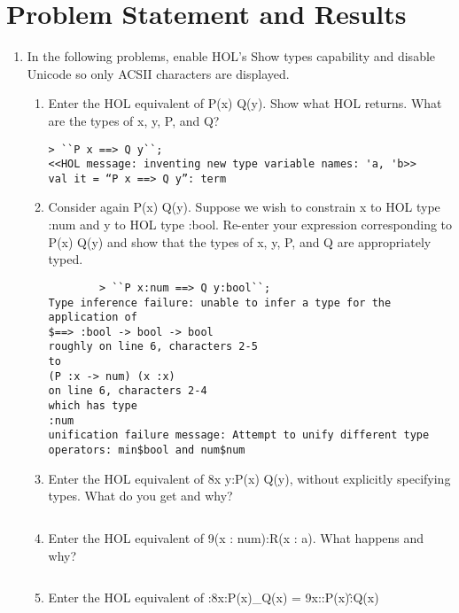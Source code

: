 \documentclass[twoside]{report}
\begin{document}
\section{Problem Statement and Results}
\begin{enumerate}
    \item In the following problems, enable HOL’s Show types capability and disable Unicode so only ACSII characters are displayed.
    \begin{enumerate}
        \item Enter the HOL equivalent of P(x) Q(y). Show what HOL returns. What are the types of x, y, P, and Q?
\begin{scriptsize}
    \begin{verbatim}
> ``P x ==> Q y``;
<<HOL message: inventing new type variable names: 'a, 'b>>
val it = “P x ==> Q y”: term
    \end{verbatim}
\end{scriptsize}
        \item Consider again P(x) Q(y). Suppose we wish to constrain x to HOL type :num and y to HOL type :bool. Re-enter your expression corresponding to P(x) Q(y) and show that the types of x, y, P, and Q are appropriately typed.
\begin{scriptsize}
    \begin{verbatim}
        > ``P x:num ==> Q y:bool``;
Type inference failure: unable to infer a type for the application of
$==> :bool -> bool -> bool
roughly on line 6, characters 2-5
to
(P :x -> num) (x :x)
on line 6, characters 2-4
which has type
:num
unification failure message: Attempt to unify different type operators: min$bool and num$num
    \end{verbatim}
\end{scriptsize}
        \item Enter the HOL equivalent of 8x y:P(x) Q(y), without explicitly specifying types. What do you get and why?
\begin{scriptsize}
    \begin{verbatim}
    \end{verbatim}
\end{scriptsize}
        \item Enter the HOL equivalent of 9(x : num):R(x : a). What happens and why?
\begin{scriptsize}
    \begin{verbatim}
    \end{verbatim}
\end{scriptsize}
        \item Enter the HOL equivalent of :8x:P(x)\_Q(x) = 9x::P(x)\^:Q(x)

\end{enumerate}
\end{enumerate}
\end{document}
